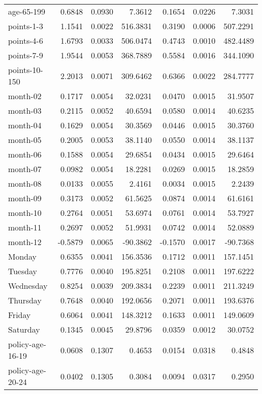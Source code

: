 \documentclass[10pt]{article}
\begin{document}
\begin{table}[ht]
\begin{tabular}{lrrrrrr}
  age-65-199 & 0.6848 & 0.0930 & 7.3612 & 0.1654 & 0.0226 & 7.3031 \\ 
  points-1-3 & 1.1541 & 0.0022 & 516.3831 & 0.3190 & 0.0006 & 507.2291 \\ 
  points-4-6 & 1.6793 & 0.0033 & 506.0474 & 0.4743 & 0.0010 & 482.4489 \\ 
  points-7-9 & 1.9544 & 0.0053 & 368.7889 & 0.5584 & 0.0016 & 344.1090 \\ 
  points-10-150 & 2.2013 & 0.0071 & 309.6462 & 0.6366 & 0.0022 & 284.7777 \\ 
  month-02 & 0.1717 & 0.0054 & 32.0231 & 0.0470 & 0.0015 & 31.9507 \\ 
  month-03 & 0.2115 & 0.0052 & 40.6594 & 0.0580 & 0.0014 & 40.6235 \\ 
  month-04 & 0.1629 & 0.0054 & 30.3569 & 0.0446 & 0.0015 & 30.3760 \\ 
  month-05 & 0.2005 & 0.0053 & 38.1140 & 0.0550 & 0.0014 & 38.1137 \\ 
  month-06 & 0.1588 & 0.0054 & 29.6854 & 0.0434 & 0.0015 & 29.6464 \\ 
  month-07 & 0.0982 & 0.0054 & 18.2281 & 0.0269 & 0.0015 & 18.2859 \\ 
  month-08 & 0.0133 & 0.0055 & 2.4161 & 0.0034 & 0.0015 & 2.2439 \\ 
  month-09 & 0.3173 & 0.0052 & 61.5625 & 0.0874 & 0.0014 & 61.6161 \\ 
  month-10 & 0.2764 & 0.0051 & 53.6974 & 0.0761 & 0.0014 & 53.7927 \\ 
  month-11 & 0.2697 & 0.0052 & 51.9931 & 0.0742 & 0.0014 & 52.0889 \\ 
  month-12 & -0.5879 & 0.0065 & -90.3862 & -0.1570 & 0.0017 & -90.7368 \\ 
  Monday & 0.6355 & 0.0041 & 156.3536 & 0.1712 & 0.0011 & 157.1451 \\ 
  Tuesday & 0.7776 & 0.0040 & 195.8251 & 0.2108 & 0.0011 & 197.6222 \\ 
  Wednesday & 0.8254 & 0.0039 & 209.3834 & 0.2239 & 0.0011 & 211.3249 \\ 
  Thursday & 0.7648 & 0.0040 & 192.0656 & 0.2071 & 0.0011 & 193.6376 \\ 
  Friday & 0.6064 & 0.0041 & 148.3212 & 0.1633 & 0.0011 & 149.0609 \\ 
  Saturday & 0.1345 & 0.0045 & 29.8796 & 0.0359 & 0.0012 & 30.0752 \\ 
  policy-age-16-19 & 0.0608 & 0.1307 & 0.4653 & 0.0154 & 0.0318 & 0.4848 \\ 
  policy-age-20-24 & 0.0402 & 0.1305 & 0.3084 & 0.0094 & 0.0317 & 0.2950 \\ 

\end{tabular}
\end{table}
\end{document}
